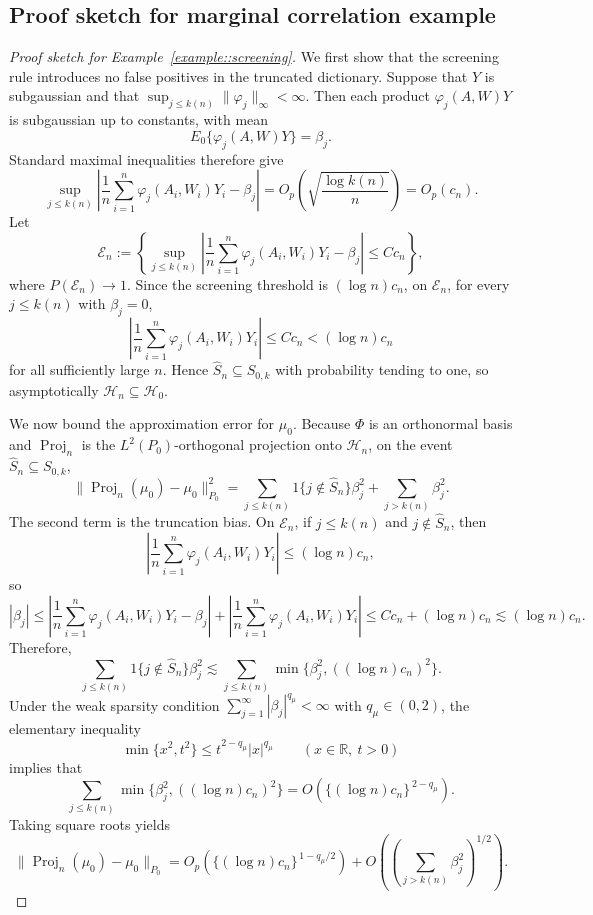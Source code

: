 \documentclass[11pt]{article}
\theoremstyle{definition}
\begin{document}
\subsection{Proof sketch for marginal correlation example}
\label{appendix:example:proof}
 \begin{proof}[Proof sketch for Example~\ref{example::screening}]
We first show that the screening rule introduces no false positives in the
truncated dictionary. Suppose that \(Y\) is subgaussian and that
\(\sup_{j\le k(n)} \|\varphi_j\|_\infty < \infty\). Then each product
\(\varphi_j(A,W)Y\) is subgaussian up to constants, with mean
\[
E_0\{\varphi_j(A,W)Y\} = \beta_j.
\]
Standard maximal inequalities therefore give
\[
\sup_{j\le k(n)}
\left|
\frac{1}{n}\sum_{i=1}^n \varphi_j(A_i,W_i)Y_i - \beta_j
\right|
=
O_p\!\left(\sqrt{\frac{\log k(n)}{n}}\right)
=
O_p(c_n).
\]
Let
\[
\mathcal E_n
:=
\left\{
\sup_{j\le k(n)}
\left|
\frac{1}{n}\sum_{i=1}^n \varphi_j(A_i,W_i)Y_i - \beta_j
\right|
\le C c_n
\right\},
\]
where \(P(\mathcal E_n)\to 1\). Since the screening threshold is
\((\log n)c_n\), on \(\mathcal E_n\), for every \(j\le k(n)\) with
\(\beta_j=0\),
\[
\left|
\frac{1}{n}\sum_{i=1}^n \varphi_j(A_i,W_i)Y_i
\right|
\le C c_n
< (\log n)c_n
\]
for all sufficiently large \(n\). Hence \(\widehat S_n\subseteq S_{0,k}\)
with probability tending to one, so asymptotically
\(\mathcal H_n\subseteq \mathcal H_0\).

We now bound the approximation error for \(\mu_0\). Because \(\Phi\) is an
orthonormal basis and \(\operatorname{Proj}_n\) is the \(L^2(P_0)\)-orthogonal
projection onto \(\mathcal H_n\), on the event
\(\widehat S_n\subseteq S_{0,k}\),
\[
\|\operatorname{Proj}_n(\mu_0)-\mu_0\|_{P_0}^2
=
\sum_{j\le k(n)}
1\{j\notin \widehat S_n\}\beta_j^2
+
\sum_{j>k(n)}\beta_j^2 .
\]
The second term is the truncation bias. On \(\mathcal E_n\), if
\(j\le k(n)\) and \(j\notin \widehat S_n\), then
\[
\left|
\frac{1}{n}\sum_{i=1}^n \varphi_j(A_i,W_i)Y_i
\right|
\le (\log n)c_n,
\]
so
\[
|\beta_j|
\le
\left|
\frac{1}{n}\sum_{i=1}^n \varphi_j(A_i,W_i)Y_i - \beta_j
\right|
+
\left|
\frac{1}{n}\sum_{i=1}^n \varphi_j(A_i,W_i)Y_i
\right|
\le
C c_n + (\log n)c_n
\lesssim
(\log n)c_n.
\]
Therefore,
\[
\sum_{j\le k(n)}
1\{j\notin \widehat S_n\}\beta_j^2
\lesssim
\sum_{j\le k(n)} \min\{\beta_j^2,((\log n)c_n)^2\}.
\]
Under the weak sparsity condition
\(\sum_{j=1}^\infty |\beta_j|^{q_\mu}<\infty\) with \(q_\mu\in(0,2)\), the
elementary inequality
\[
\min\{x^2,t^2\}\le t^{2-q_\mu}|x|^{q_\mu}
\qquad (x\in\mathbb R,\ t>0)
\]
implies that
\[
\sum_{j\le k(n)} \min\{\beta_j^2,((\log n)c_n)^2\}
=
O\!\left(\{(\log n)c_n\}^{\,2-q_\mu}\right).
\]
Taking square roots yields
\[
\|\operatorname{Proj}_n(\mu_0)-\mu_0\|_{P_0}
=
O_p\!\left(\{(\log n)c_n\}^{\,1-q_\mu/2}\right)
+
O\!\left(\left(\sum_{j>k(n)}\beta_j^2\right)^{1/2}\right).
\]


\end{proof}
\end{document}
